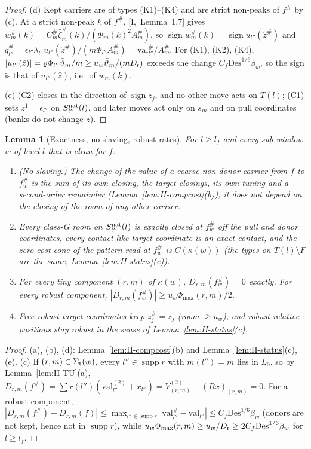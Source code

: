 \documentclass[10pt]{amsart}
\newtheorem{lemma}[theorem]{Lemma}
\theoremstyle{definition}
\theoremstyle{remark}
\newcommand{\supp}{\operatorname{supp}}
\newcommand{\sgn}{\operatorname{sign}}
\newcommand{\zh}{\hat z}
\begin{document}
\begin{proof}
(d) Kept carriers are of types (K1)--(K4) and are strict non-peaks of
$f^\#$ by (c).  At a strict non-peak $k$ of $f^\#$, [I,~Lemma~1.7] gives
$w^\#_m(k)=C^\#_m\hat\zeta^\#_m(k)/(\Phi_m(k)^2A^\#_m)$, so $\sgn w^\#_m(k)=
\sgn u_{l''}(\zh^\#)$ and $q^\#_{l''}=\epsilon_{l''}\lambda_{l''}u_{l''}(\zh^\#)
/(m\Phi_{l''}A^\#_m)=\mathrm{val}^\#_{l''}/A^\#_m$.  For (K1), (K2), (K4),
$|u_{l''}(\zh)|=\varrho\Phi_{l''}\bar\vartheta_m/m\ge u_w\bar\vartheta_m/(mD_{\rm r})$ exceeds
the change $C_f\mathrm{Des}^{1/6}\beta_w$, so the sign is that of
$u_{l''}(\zh)$, i.e.\ of $w_m(k)$.

(e) (C2) closes in the direction of $\sgn z_j$, and no other move acts on
$T(l)$; (C1) sets $z^1=\epsilon_{l''}$ on $S^{\rm nat}_{l''}(l)$, and later
moves act only on $s_m$ and on pull coordinates (banks do not change $z$).
\end{proof}

\begin{lemma}[Exactness, no slaving, robust rates]\label{lem:II-exactrobust}
For $l\ge l_f$ and every sub-window $w$ of level $l$ that is clean for $f$:
\begin{enumerate}
\item[(a)] \textup{(No slaving.)}  The change of the value of a coarse
non-donor carrier from $f$ to $f^\#_w$ is the sum of its own closing, the
target closings, its own tuning and a second-order remainder
(Lemma~\ref{lem:II-compcost}(b)); it does not depend on the closing of the
room of any other carrier.
\item[(b)] Every class-G room on $S^{\rm nat}_{l''}(l)$ is exactly closed at
$f^\#_w$ off the pull and donor coordinates, every contact-like target
coordinate is an exact contact, and the zero-cost cone of the pattern read
at $f^\#_w$ is $C(\kappa(w))$ \textup{(}the types on $T(l)\setminus F$ are
the same, Lemma~\ref{lem:II-status}(e)\textup{)}.
\item[(c)] For every tiny component $(r,m)$ of $\kappa(w)$,
$D_{r,m}(f^\#_w)=0$ exactly.  For every robust component,
$|D_{r,m}(f^\#_w)|\ge u_w\Phi_{\max}(r,m)/2$.
\item[(d)] Free-robust target coordinates keep $z^\#_j=z_j$ (room $\ge u_w$),
and robust relative positions stay robust in the sense of
Lemma~\ref{lem:II-status}(c).
\end{enumerate}
\end{lemma}

\begin{proof}
(a), (b), (d): Lemma~\ref{lem:II-compcost}(b) and
Lemma~\ref{lem:II-status}(c),(e).  (c) If $(r,m)\in\Sigma_{\rm t}(w)$, every
$l''\in\supp r$ with $m(l'')=m$ lies in $L_0$, so by
Lemma~\ref{lem:II-TU}(a), $D_{r,m}(f^\#)=\sum r(l'')(\mathrm{val}^{(2)}_{l''}+
x_{l''})=V^{(2)}_{(r,m)}+(Rx)_{(r,m)}=0$.  For a robust component,
$|D_{r,m}(f^\#)-D_{r,m}(f)|\le\max_{l''\in\supp r}|\mathrm{val}^\#_{l''}-
\mathrm{val}_{l''}|\le C_f\mathrm{Des}^{1/6}\beta_w$ (donors are not kept,
hence not in $\supp r$), while $u_w\Phi_{\max}(r,m)\ge u_w/D_{\rm r}\ge2C_f
\mathrm{Des}^{1/6}\beta_w$ for $l\ge l_f$.
\end{proof}
\end{document}
